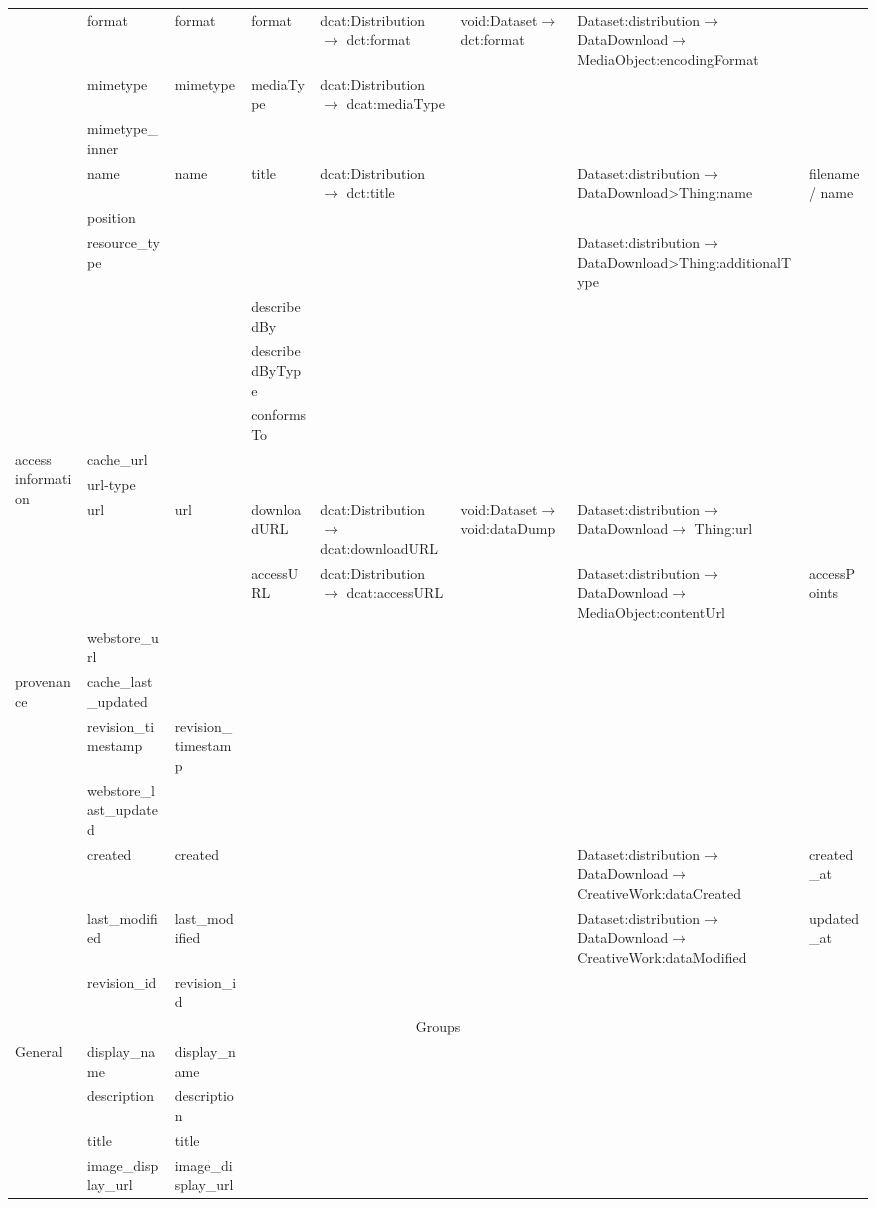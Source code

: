 \documentclass[runningheads,a4paper]{llncs}
\begin{document}
\begin{landscape}
{\begin{longtable}{|p{1cm}|m{2.3cm}|m{2.2cm}|m{2.5cm}|p{3.6cm}|m{3.6cm}|m{3.6cm}|m{2.5cm}|}
\cline{2-8}
 & format & format & format & dcat:Distribution$\rightarrow$ dct:format & void:Dataset$\rightarrow$ dct:format & Dataset:distribution$\rightarrow$ DataDownload$\rightarrow$ MediaObject:encodingFormat & \tabularnewline
\cline{2-8}
 & mimetype & mimetype & mediaType & dcat:Distribution$\rightarrow$ dcat:mediaType &  &  & \tabularnewline
\cline{2-8}
 & mimetype\_inner &  &  &  &  &  & \tabularnewline
\cline{2-8}
 & name & name & title & dcat:Distribution$\rightarrow$ dct:title &  & Dataset:distribution$\rightarrow$ DataDownload>Thing:name & filename / name\tabularnewline
\cline{2-8}
 & position &  &  &  &  &  & \tabularnewline
\cline{2-8}
 & resource\_type &  &  &  &  & Dataset:distribution$\rightarrow$ DataDownload>Thing:additionalType & \tabularnewline
\cline{2-8}
 &  &  & describedBy &  &  &  & \tabularnewline
\cline{2-8}
 &  &  & describedByType &  &  &  & \tabularnewline
\cline{2-8}
 &  &  & conformsTo &  &  &  & \tabularnewline
\hline
\multirow{5}{2cm}{access information} & cache\_url &  &  &  &  &  & \tabularnewline
\cline{2-8}
 & url-type &  &  &  &  &  & \tabularnewline
\cline{2-8}
 & url & url & downloadURL & dcat:Distribution$\rightarrow$ dcat:downloadURL & void:Dataset$\rightarrow$ void:dataDump & Dataset:distribution$\rightarrow$ DataDownload$\rightarrow$ Thing:url & \tabularnewline
\cline{2-8}
 &  &  & accessURL & dcat:Distribution$\rightarrow$ dcat:accessURL &  & Dataset:distribution$\rightarrow$ DataDownload$\rightarrow$ MediaObject:contentUrl & accessPoints\tabularnewline
\cline{2-8}
 & webstore\_url &  &  &  &  &  & \tabularnewline
\hline
\multirow{6}{2cm}{provenance} & cache\_last\_updated &  &  &  &  &  & \tabularnewline
\cline{2-8}
 & revision\_timestamp & revision\_timestamp &  &  &  &  & \tabularnewline
\cline{2-8}
 & webstore\_last\_updated &  &  &  &  &  & \tabularnewline
\cline{2-8}
 & created & created &  &  &  & Dataset:distribution$\rightarrow$ DataDownload$\rightarrow$ CreativeWork:dataCreated & created\_at\tabularnewline
\cline{2-8}
 & last\_modified & last\_modified &  &  &  & Dataset:distribution$\rightarrow$ DataDownload$\rightarrow$ CreativeWork:dataModified & updated\_at\tabularnewline
\cline{2-8}
 & revision\_id & revision\_id &  &  &  &  & \tabularnewline
\hline
\multicolumn{8}{|c|}{Groups}\tabularnewline
\hline
\multirow{7}{2cm}{General} & display\_name & display\_name &  &  &  &  & \tabularnewline
\cline{2-8}
 & description & description &  &  &  &  & \tabularnewline
\cline{2-8}
 & title & title &  &  &  &  & \tabularnewline
\cline{2-8}
 & image\_display\_url & image\_display\_url &  &  &  &  & \tabularnewline

\end{longtable}}
\end{landscape}
\end{document}
